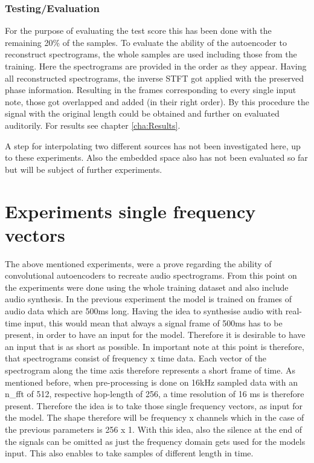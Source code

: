 \subsubsection{Testing/Evaluation}
For the purpose of evaluating the test score this has been done with the remaining 20\% of the samples. To evaluate the ability of the autoencoder to reconstruct spectrograms, the whole samples are used including those from the training. Here the spectrograms are provided in the order as they appear. Having all reconstructed spectrograms, the inverse STFT got applied with the preserved phase information. Resulting in the frames corresponding to every single input note, those got overlapped and added (in their right order). By this procedure the signal with the original length could be obtained and further on evaluated auditorily. For results see chapter \ref{cha:Results}. 

A step for interpolating two different sources has not been investigated here, up to these experiments. Also the embedded space also has not been evaluated so far but will be subject of further experiments.

\section{Experiments single frequency vectors}
The above mentioned experiments, were a prove regarding the ability of convolutional autoencoders to recreate audio spectrograms. From this point on the experiments were done using the whole training dataset and also include audio synthesis. In the previous experiment the model is trained on frames of audio data which are 500ms long. Having the idea to synthesise audio with real-time input, this would mean that always a signal frame of 500ms has to be present, in order to have an input for the model. Therefore it is desirable to have an input that is as short as possible. In important note at this point is therefore, that spectrograms consist of frequency x time data. Each vector of the spectrogram along the time axis therefore represents a short frame of time. As mentioned before, when pre-processing is done on 16kHz sampled data with an n\_fft of 512, respective hop-length of 256, a time resolution of 16 ms is therefore present. Therefore the idea is to take those single frequency vectors, as input for the model. The shape therefore will be frequency x channels which in the case of the previous parameters is 256 x 1. With this idea, also the silence at the end of the signals can be omitted as just the frequency domain gets used for the models input. This also enables to take samples of different length in time.


